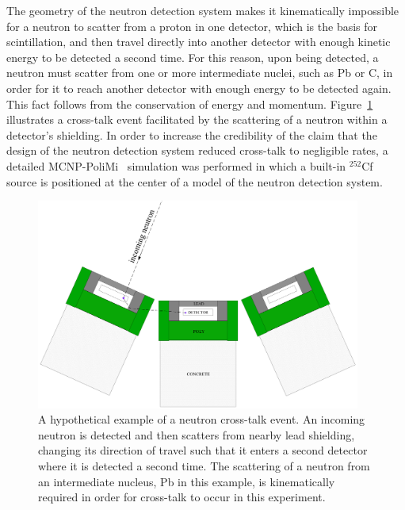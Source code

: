 The geometry of the neutron detection system makes it kinematically impossible for a neutron to scatter from a proton in one detector, which is the basis for scintillation, and then travel directly into another detector with enough kinetic energy to be detected a second time.
For this reason, upon being detected, a neutron must scatter from one or more intermediate nuclei, such as Pb or C, in order for it to reach another detector with enough energy to be detected again.
This fact follows from the conservation of energy and momentum.
Figure~\ref{fig:CrossTalkExample} illustrates a cross-talk event facilitated by the scattering of a neutron within a detector's shielding.
In order to increase the credibility of the claim that the design of the neutron detection system reduced cross-talk to negligible rates, a detailed MCNP-PoliMi~\cite{MCNP_POLIMI} simulation was performed in which a built-in $^{252}$Cf source is positioned at the center of a model of the neutron detection system.
\begin{figure}
    \centering
    \includegraphics[width = 0.95\textwidth]{Content/Errors/CrossTalkExample.png}
    \caption{A hypothetical example of a neutron cross-talk event.
An incoming neutron is detected and then scatters from nearby lead shielding, changing its direction of travel such that it enters a second detector where it is detected a second time.
The scattering of a neutron from an intermediate nucleus, Pb in this example, is kinematically required in order for cross-talk to occur in this experiment.}
    \label{fig:CrossTalkExample}
\end{figure}

